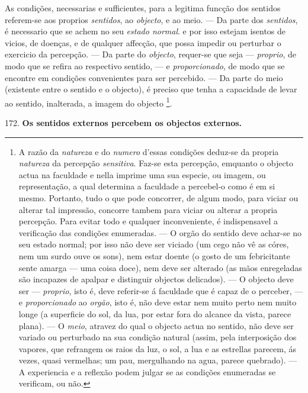 
As condições, necessarias e sufficientes, para a legitima funcção dos sentidos referem-se aos proprios \emph{sentidos}, ao \emph{objecto}, e ao meio. --- Da parte dos \emph{sentidos}, é necessario que se achem no seu \emph{estado normal}. e por isso estejam isentos de vicios, de doenças, e de qualquer affecção, que possa impedir ou perturbar o exercicio da percepção. --- Da parte do \emph{objecto}, requer-se que seja --- \emph{proprio}, de modo que se refira ao respectivo sentido, --- e \emph{proporcionado}, de modo que se encontre em condições convenientes para ser percebido. --- Da parte do meio (existente entre o sentido e o objecto), é preciso que tenha a capacidade de levar ao sentido, inalterada, a imagem do objecto \footnote{A razão da \emph{natureza} e do \emph{numero} d'essas condições deduz-se da propria \emph{natureza} da percepção \emph{sensitiva}. Faz-se esta percepção, emquanto o objecto actua na faculdade e nella imprime uma sua especie, ou imagem, ou representação, a qual determina a faculdade a percebel-o como é em si mesmo. Portanto, tudo o que pode concorrer, de algum modo, para viciar ou alterar tal impressão, concorre tambem para viciar ou alterar a propria percepção. Para evitar todo e qualquer inconveniente, é indispensavel a verificação das condições enumeradas. --- O orgão do sentido deve achar-se no seu estado normal; por isso não deve ser viciado (um cego não vê as córes, nem um surdo ouve os sons), nem estar doente (o gosto de um febricitante sente amarga --- uma coisa doce), nem deve ser alterado (as mãos enregeladas são incapazes de apalpar e distinguir objectos delicados). --- O objecto deve ser --- \emph{proprio}, isto é, deve referir-se á faculdade que é capaz de o perceber, --- e \emph{proporcionado} ao \emph{orgão}, isto é, não deve estar nem muito perto nem muito longe (a superficie do sol, da lua, por estar fora do alcance da vista, parece plana). --- O \emph{meio}, atravez do qual o objecto actua no sentido, não deve ser variado ou perturbado na sua condição natural (assim, pela interposição dos vapores, que refrangem os raios da luz, o sol, a lua e as estrellas parecem, ás vezes, quasi vermelhas; um pau, mergulhando na agua, parece quebrado). --- A experiencia e a reflexão podem julgar se as condições enumeradas se verificam, ou não.}.

172. \textbf{Os sentidos externos percebem os objectos externos.}

